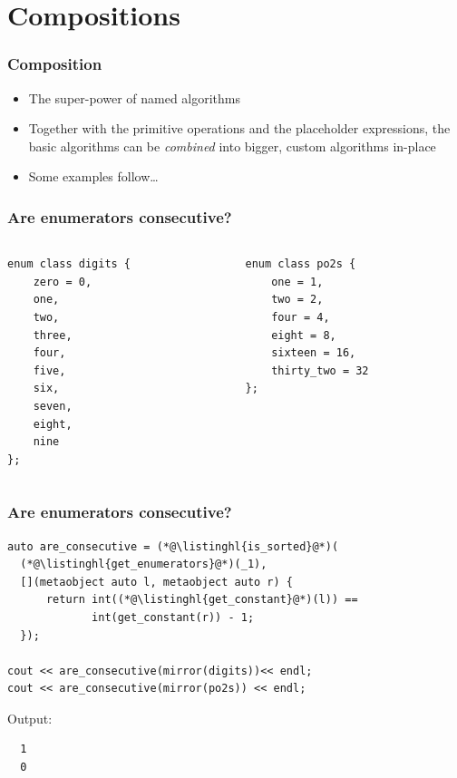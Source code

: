 \documentclass[compress,table,xcolor=table]{beamer}
\begin{document}
\section{Compositions}
\begin{frame}
  \frametitle{Composition}
  \larger
  \begin{itemize}
    \item {\larger The {\larger super-power} of named algorithms}
    \item Together with the primitive operations and the placeholder expressions,
      the basic algorithms can be {\em \larger combined} into bigger,
      custom algorithms in-place
    \item Some examples follow\ldots
  \end{itemize}
\end{frame}
\begin{frame}[fragile]
  \frametitle{Are enumerators consecutive?}
  \begin{columns}
    \begin{column}{.43\textwidth}
      \begin{lstlisting}[language=c++2x,basicstyle=\small\ttfamily]
enum class digits {
    zero = 0,
    one,
    two,
    three,
    four,
    five,
    six,
    seven,
    eight,
    nine
};
      \end{lstlisting}
    \end{column}
    \begin{column}{.47\textwidth}
      \begin{lstlisting}[language=c++2x,basicstyle=\small\ttfamily]
enum class po2s {
    one = 1,
    two = 2,
    four = 4,
    eight = 8,
    sixteen = 16,
    thirty_two = 32
};
      \end{lstlisting}
    \end{column}
  \end{columns}
\end{frame}
\begin{frame}[fragile]
  \frametitle{Are enumerators consecutive?}
  \begin{lstlisting}[language=c++2x,basicstyle=\small\ttfamily]
auto are_consecutive = (*@\listinghl{is_sorted}@*)(
  (*@\listinghl{get_enumerators}@*)(_1),
  [](metaobject auto l, metaobject auto r) {
      return int((*@\listinghl{get_constant}@*)(l)) ==
             int(get_constant(r)) - 1;
  });

cout << are_consecutive(mirror(digits))<< endl;
cout << are_consecutive(mirror(po2s)) << endl;
  \end{lstlisting}
  Output:
  \begin{verbatim}
  1
  0
  \end{verbatim}
\end{frame}
\end{document}
